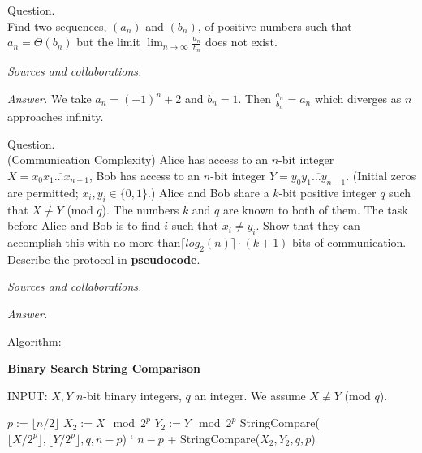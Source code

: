 \documentclass{amsart}
\begin{document}
 Question. \\
Find two sequences, $(a_n)$ and $(b_n)$, of positive numbers such that $a_n=\Theta(b_n)$ but the limit $\lim_{n\to\infty}\frac{a_n}{b_n}$ does not exist.

\medskip \noindent
\emph{Sources and collaborations.}

\medskip \noindent 
\emph{Answer.}
We take $a_n = (-1)^n + 2$ and $b_n = 1$. Then $\frac{a_n}{b_n}= a_n$ which diverges as $n$ approaches infinity.

\newpage
{}

 Question. \\
(Communication Complexity) Alice has access to an $n$-bit integer $X=\overline{x_0x_1\dots x_{n-1}}$, Bob has access to an $n$-bit integer $Y=\overline{y_0y_1\dots y_{n-1}}$. (Initial zeros are permitted; $x_i, y_i\in \{0,1\}$.) Alice and Bob share a $k$-bit positive integer $q$ such that $X\not\equiv Y$ (mod $q$). The numbers $k$ and $q$ are known to both of them. The task before Alice and Bob is to find $i$ such that $x_i\neq y_i$. Show that they can accomplish this with no more than$\lceil log_2(n)\rceil\cdot (k+1)$ bits of communication. Describe the protocol in \textbf{pseudocode}. 

\medskip \noindent
\emph{Sources and collaborations.}

\medskip \noindent 
\emph{Answer.}

\medskip \noindent Algorithm:

\medskip \noindent 

	\textbf{Binary Search String Comparison}

\medskip INPUT: $X, Y$ $n$-bit binary integers, $q$ an integer. We assume $X\not\equiv Y$ (mod $q$).

\begin{algorithmic}[1]

\EndIf
\State $p:= \lfloor n/2\rfloor$
\State $X_2:= X \mod 2^p$
\State $Y_2:= Y \mod 2^p$
	\State\Return StringCompare($\lfloor X/2^p\rfloor, \lfloor Y/2^p\rfloor, q, n-p$)
\Else
`	\State\Return $n-p$ + StringCompare($X_2, Y_2, q, p$)
	\State{} 
\EndIf
\EndProcedure

\end{algorithmic}
\end{document}
